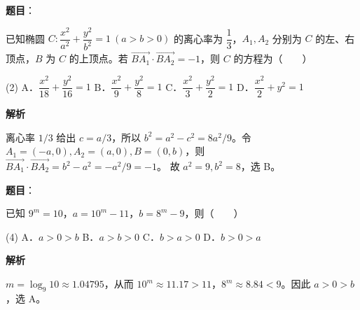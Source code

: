 \begin{answer}

\textbf{题目}：

已知椭圆 $C:\dfrac{x^2}{a^2}+\dfrac{y^2}{b^2}=1\ (a>b>0)$ 的离心率为 $\dfrac13$，$A_1,A_2$ 分别为 $C$ 的左、右顶点，$B$ 为 $C$ 的上顶点。若 $\overrightarrow{BA_1}\cdot\overrightarrow{BA_2}=-1$，则 $C$ 的方程为\mbox{（　　）}

\begin{gkopts}(2)
\task A．$\dfrac{x^2}{18}+\dfrac{y^2}{16}=1$
\task B．$\dfrac{x^2}{9}+\dfrac{y^2}{8}=1$
\task C．$\dfrac{x^2}{3}+\dfrac{y^2}{2}=1$
\task D．$\dfrac{x^2}{2}+y^2=1$
\end{gkopts}

\textbf{解析}

离心率 $1/3$ 给出 $c=a/3$，所以 $b^2=a^2-c^2=8a^2/9$。令 $A_1=(-a,0),A_2=(a,0),B=(0,b)$，则
$\overrightarrow{BA_1}\cdot\overrightarrow{BA_2}=b^2-a^2=-a^2/9=-1$。
故 $a^2=9,b^2=8$，选 B。


\end{answer}
\begin{answer}

\textbf{题目}：

已知 $9^m=10$，$a=10^m-11$，$b=8^m-9$，则\mbox{（　　）}

\begin{gkopts}(4)
\task A．$a>0>b$
\task B．$a>b>0$
\task C．$b>a>0$
\task D．$b>0>a$
\end{gkopts}

\textbf{解析}

$m=\log_9 10\approx1.04795$，从而 $10^m\approx11.17>11$，$8^m\approx8.84<9$。因此 $a>0>b$，选 A。


\end{answer}

